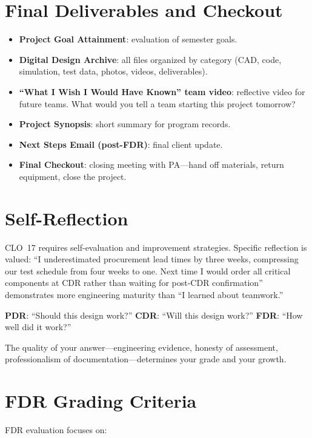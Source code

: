 \section{Final Deliverables and Checkout}
\begin{itemize}[nosep,leftmargin=1.5em]
\item \textbf{Project Goal Attainment}: evaluation of semester goals.
\item \textbf{Digital Design Archive}: all files organized by category (CAD, code, simulation, test data, photos, videos, deliverables).
\item \textbf{``What I Wish I Would Have Known'' team video}: reflective video for future teams. What would you tell a team starting this project tomorrow?
\item \textbf{Project Synopsis}: short summary for program records.
\item \textbf{Next Steps Email (post-FDR)}: final client update.
\item \textbf{Final Checkout}: closing meeting with PA---hand off materials, return equipment, close the project.
\end{itemize}

\section{Self-Reflection}
CLO~17 requires self-evaluation and improvement strategies. Specific reflection is valued: ``I underestimated procurement lead times by three weeks, compressing our test schedule from four weeks to one. Next time I would order all critical components at CDR rather than waiting for post-CDR confirmation'' demonstrates more engineering maturity than ``I learned about teamwork.''

\begin{keyconceptbox}
\textbf{PDR}: ``Should this design work?'' \textbf{CDR}: ``Will this design work?'' \textbf{FDR}: ``How well did it work?''

The quality of your answer---engineering evidence, honesty of assessment, professionalism of documentation---determines your grade and your growth.
\end{keyconceptbox}


\section{FDR Grading Criteria}
FDR evaluation focuses on:

